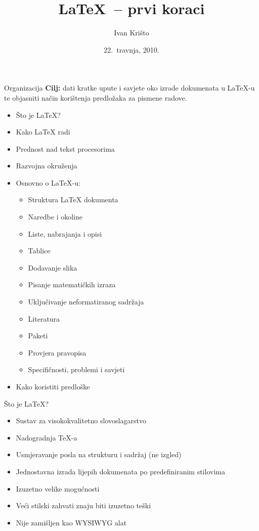 \documentclass{beamer}
\title{\LaTeX\ -- prvi koraci}
\author{Ivan Krišto}
\institute{Fakultet elektrotehnike i računarstva, Zagreb}
\date{22.~travnja, 2010.}
\begin{document}
\begin{frame}[t,plain]
\titlepage
\end{frame}

\begin{frame}[t]{Organizacija}
\textbf{Cilj:} dati kratke upute i savjete oko izrade dokumenata u \LaTeX-u te
objasniti način korištenja predložaka za pismene radove.
\pause
\begin{multicols}{2}
\begin{itemize}
  \item Što je \LaTeX{}?
  \item Kako \LaTeX{} radi
  \item Prednost nad tekst procesorima
  \item Razvojna okruženja
\pause
  \item Osnovno o \LaTeX-u:
  \begin{itemize}
    \item Struktura \LaTeX{} dokumenta
    \item Naredbe i okoline
    \item Liste, nabrajanja i opisi
    \item Tablice
    \item Dodavanje slika
    \item Pisanje matematičkih izraza
    \item Uključivanje neformatiranog sadržaja 
    \item Literatura
    \item Paketi
    \item Provjera pravopisa
    \item Specifičnosti, problemi i savjeti
  \end{itemize}
\pause
  \item Kako koristiti predloške
\end{itemize}
\end{multicols}
\end{frame}

\begin{frame}[t]{Što je \LaTeX{}?}
\begin{itemize}
  \item Sustav za visokokvalitetno slovoslagarstvo
  \item Nadogradnja \TeX-a
  \item Usmjeravanje posla na strukturu i sadržaj (ne izgled)
  \item Jednostavna izrada lijepih dokumenata po predefiniranim stilovima
  \item Izuzetno velike mogućnosti
  \item Veći stilski zahvati znaju biti izuzetno teški
  \item Nije zamišljen kao WYSIWYG alat
\end{itemize}
\end{frame}
\end{document}
